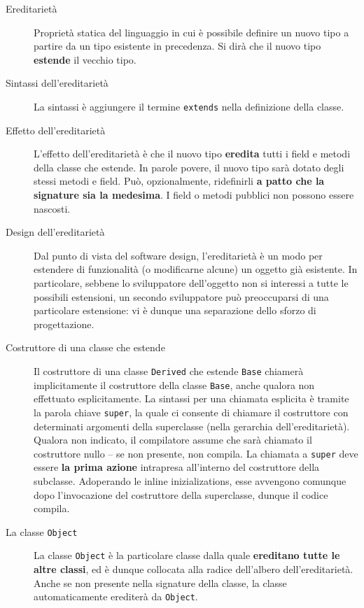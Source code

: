 \documentclass[\fontsizeclass,twocolumn]{\classname}
\theoremstyle{definition}
\theoremstyle{definition}
\begin{document}
\begin{description}
    \item[Ereditarietà] Proprietà statica del linguaggio in cui è possibile
        definire un nuovo tipo a partire da un tipo esistente in precedenza. Si
        dirà che il nuovo tipo \textbf{estende} il vecchio tipo.
    \item[Sintassi dell'ereditarietà] La sintassi è aggiungere il termine
        \texttt{extends} nella definizione della classe.
    \item[Effetto dell'ereditarietà] L'effetto dell'ereditarietà è che il nuovo
        tipo \textbf{eredita} tutti i field e metodi della classe che estende.
        In parole povere, il nuovo tipo sarà dotato degli stessi metodi e
        field. Può, opzionalmente, ridefinirli \textbf{a patto che la signature
        sia la medesima}. I field o metodi pubblici non possono essere
        nascosti.
    \item[Design dell'ereditarietà] Dal punto di vista del software design,
        l'ereditarietà è un modo per estendere di funzionalità (o modificarne
        alcune) un oggetto già esistente. In particolare, sebbene lo
        sviluppatore dell'oggetto non si interessi a tutte le possibili
        estensioni, un secondo sviluppatore può preoccuparsi di una particolare
        estensione: vi è dunque una separazione dello sforzo di progettazione.
    \item[Costruttore di una classe che estende] Il costruttore di una classe
        \texttt{Derived} che estende \texttt{Base} chiamerà implicitamente il
        costruttore della classe \texttt{Base}, anche qualora non effettuato
        esplicitamente. La sintassi per una chiamata esplicita è tramite la
        parola chiave \texttt{super}, la quale ci consente di chiamare il
        costruttore con determinati argomenti della superclasse (nella
        gerarchia dell'ereditarietà). Qualora non indicato, il compilatore
        assume che sarà chiamato il costruttore nullo -- se non presente, non
        compila. La chiamata a \texttt{super} deve essere \textbf{la prima
        azione} intrapresa all'interno del costruttore della subclasse.
        Adoperando le inline inizializations, esse avvengono comunque dopo
        l'invocazione del costruttore della superclasse, dunque il codice
        compila.
    \item[La classe \texttt{Object}] La classe \texttt{Object} è la particolare
        classe dalla quale \textbf{ereditano tutte le altre classi}, ed è
        dunque collocata alla radice dell'albero dell'ereditarietà. Anche se
        non presente nella signature della classe, la classe automaticamente
        erediterà da \texttt{Object}.
\end{description}
\end{document}
